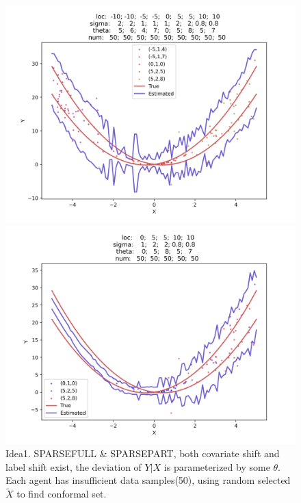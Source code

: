 \documentclass[12pt, a4paper, oneside]{article}
\begin{document}
    \begin{figure}[htbp]
        \centering
        \begin{minipage}{0.495\linewidth}
            \centering
            \includegraphics[width=0.98\linewidth]{fig/Ex1_2/SPARSEFULL.png}
        \end{minipage}
        \begin{minipage}{0.495\linewidth}
            \centering
            \includegraphics[width=0.98\linewidth]{fig/Ex1_2/SPARSEPART.png}
        \end{minipage}
        \caption{Idea1. SPARSEFULL \& SPARSEPART, both covariate shift and label shift exist, the deviation of $Y|X$ is parameterized by some $\theta$. Each agent has insufficient data samples(50), using random selected $\tilde{X}$ to find conformal set.}
        \label{Fig6}
    \end{figure}
\end{document}
